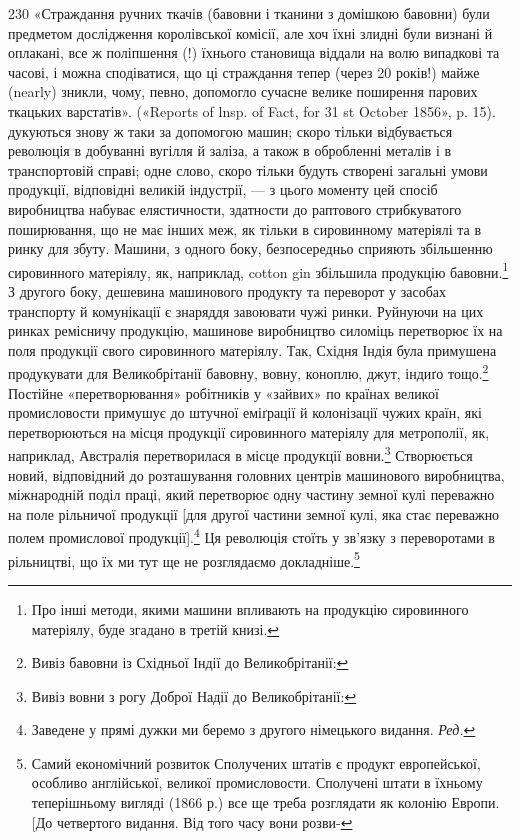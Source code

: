 230 «Страждання ручних ткачів (бавовни і тканини з домішкою
бавовни) були предметом дослідження королівської комісії, але хоч їхні
злидні були визнані й оплакані, все ж поліпшення (!) їхнього становища
віддали на волю випадкові та часові, і можна сподіватися, що ці страждання
тепер (через 20 років!) майже (nearly) зникли, чому, певно, допомогло
сучасне велике поширення парових ткацьких варстатів». («Reports
of lnsp. of Fact, for 31 st October 1856», p. 15).
дукуються знову ж таки за допомогою машин; скоро тільки відбувається
революція в добуванні вугілля й заліза, а також в обробленні
металів і в транспортовій справі; одне слово, скоро тільки
будуть створені загальні умови продукції, відповідні великій
індустрії, — з цього моменту цей спосіб виробництва набуває елястичности,
здатности до раптового стрибкуватого поширювання, що
не має інших меж, як тільки в сировинному матеріялі та в ринку
для збуту. Машини, з одного боку, безпосередньо сприяють збільшенню
сировинного матеріялу, як, наприклад, cotton gin збільшила
продукцію бавовни.\footnote{
Про інші методи, якими машини впливають на продукцію сировинного
матеріялу, буде згадано в третій книзі.
} З другого боку, дешевина машинового
продукту та переворот у засобах транспорту й комунікації є
знаряддя завоювати чужі ринки. Руйнуючи на цих ринках ремісничу
продукцію, машинове виробництво силоміць перетворює
їх на поля продукції свого сировинного матеріялу. Так, Східня
Індія була примушена продукувати для Великобрітанії бавовну,
вовну, коноплю, джут, індиґо тощо.\footnote{
Вивіз бавовни із Східньої Індії до Великобрітанії:
} Постійне «перетворювання»
робітників у «зайвих» по країнах великої промисловости примушує
до штучної еміґрації й колонізації чужих країн, які перетворюються
на місця продукції сировинного матеріялу для метрополії,
як, наприклад, Австралія перетворилася в місце продукції
вовни.\footnote{
Вивіз вовни з рогу Доброї Надії до Великобрітанії:
} Створюється новий, відповідний до розташування головних
центрів машинового виробництва, міжнародній поділ праці,
який перетворює одну частину земної кулі переважно на поле
рільничої продукції [для другої частини земної кулі, яка стає
переважно полем промислової продукції].\footnote*{
Заведене у прямі дужки ми беремо з другого німецького видання.
\emph{Ред.}
} Ця революція стоїть
у зв’язку з переворотами в рільництві, що їх ми тут ще не розглядаємо
докладніше.\footnote{
Самий економічний розвиток Сполучених штатів є продукт европейської,
особливо англійської, великої промисловости. Сполучені штати
в їхньому теперішньому вигляді (1866 р.) все ще треба розглядати як
колонію Европи. [До четвертого видання. Від того часу вони розви-
}

